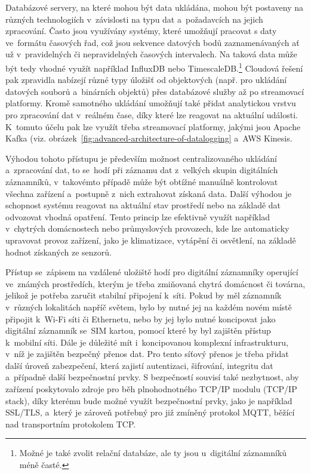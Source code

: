 
Databázové servery, na které mohou být data ukládána, mohou být postaveny na různých technologiích v~závislosti na typu dat a~požadavcích na jejich zpracování. Často jsou využívány systémy, které umožňují pracovat s daty ve~formátu časových řad, což jsou sekvence datových bodů zaznamenávaných ať už v~pravidelných či nepravidelných časových intervalech. Na taková data může být tedy vhodné využít například InfluxDB nebo TimescaleDB.\footnote{Možné je také zvolit relační databáze, ale ty jsou u~digitální záznamníků méně časté.} Cloudová řešení pak zpravidla nabízejí různé typy úložišť od objektových (např. pro ukládání datových souborů a~binárních objektů) přes databázové služby až po streamovací platformy. Kromě samotného ukládání umožňují také přidat analytickou vrstvu pro zpracování dat v~reálném čase, díky které lze reagovat na aktuální události. K~tomuto účelu pak lze využít třeba streamovací platformy, jakými jsou Apache Kafka (viz. obrázek~\ref{fig:advanced-architecture-of-datalogging} a~AWS Kinesis.~\cite{springer_analysis_time_series_db_edge_computing}

Výhodou tohoto přístupu je především možnost centralizovaného ukládání a~zpracování dat, to se~hodí při záznamu dat z~velkých skupin digitálních záznamníků, v~takovémto případě může být obtížné manuálně kontrolovat všechna zařízení a~postupně z~nich extrahovat získaná data. Další výhodou je schopnost systému reagovat na aktuální stav prostředí nebo na základě dat odvozovat vhodná opatření. Tento princip lze efektivně využít například v~chytrých domácnostech nebo průmyslových provozech, kde lze automaticky upravovat provoz zařízení, jako je klimatizace, vytápění či osvětlení, na základě hodnot získaných ze senzorů.~\cite{springer_analysis_time_series_db_edge_computing, iot_datalogger_with_timestamping, researchgate_general_dataloggger_multiple_sdcards}

Přístup se~zápisem na vzdálené uložiště hodí pro digitální záznamníky operující ve~známých prostředích, kterým je třeba zmiňovaná chytrá domácnost či továrna, jelikož je potřeba zaručit stabilní připojení k~síti. Pokud by měl záznamník v~různých lokalitách napříč světem, bylo by nutné jej na každém novém místě připojit k~Wi-Fi síti či Ethernetu, nebo by jej bylo nutné koncipovat jako digitální záznamník se~SIM kartou, pomocí které by byl zajištěn přístup k~mobilní síti. Dále je důležité mít i~koncipovanou komplexní infrastrukturu, v~níž je zajištěn bezpečný přenos dat. Pro tento síťový přenos je třeba přidat další úroveň zabezpečení, která zajistí autentizaci, šifrování, integritu dat a~případně další bezpečnostní prvky. S bezpečností souvisí také nezbytnost, aby zařízení poskytovalo zdroje pro běh plnohodnotného TCP/IP modulu (TCP/IP stack), díky kterému bude možné využít bezpečnostní prvky, jako je například SSL/TLS, a~který je zároveň potřebný pro již zmíněný protokol MQTT, běžící nad transportním protokolem TCP.~\cite{springer_analysis_time_series_db_edge_computing, iot_datalogger_with_timestamping, researchgate_general_dataloggger_multiple_sdcards, iot_threats}


